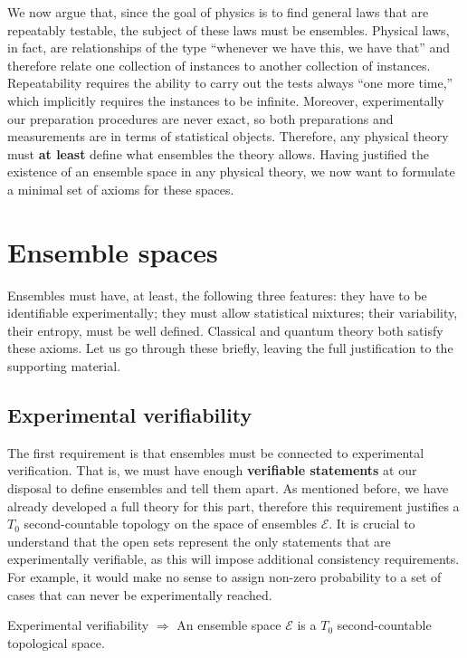 \documentclass[10pt,twocolumn, nofootinbib]{revtex4-2}
\newcommand{\Ens}[1][E] {\mathcal{#1}} %
\begin{document}
We now argue that, since the goal of physics is to find general laws that are repeatably testable, the subject of these laws must be ensembles. Physical laws, in fact, are relationships of the type ``whenever we have this, we have that'' and therefore relate one collection of instances to another collection of instances. Repeatability requires the ability to carry out the tests always ``one more time,'' which implicitly requires the instances to be infinite. Moreover, experimentally our preparation procedures are never exact, so both preparations and measurements are in terms of statistical objects. Therefore, any physical theory must \textbf{at least} define what ensembles the theory allows. Having justified the existence of an ensemble space in any physical theory, we now want to formulate a minimal set of axioms for these spaces.

\section{Ensemble spaces}

Ensembles must have, at least, the following three features: they have to be identifiable experimentally; they must allow statistical mixtures; their variability, their entropy, must be well defined. Classical and quantum theory both satisfy these axioms. Let us go through these briefly, leaving the full justification to the supporting material.

\subsection{Experimental verifiability}
The first requirement is that ensembles must be connected to experimental verification. That is, we must have enough \textbf{verifiable statements} at our disposal to define ensembles and tell them apart. As mentioned before, we have already developed a full theory for this part, therefore this requirement justifies a $T_0$ second-countable topology on the space of ensembles $\Ens$. It is crucial to understand that the open sets represent the only statements that are experimentally verifiable, as this will impose additional consistency requirements. For example, it would make no sense to assign non-zero probability to a set of cases that can never be experimentally reached.

\begin{tcolorbox}[colback=white, colframe=black]
	Experimental verifiability $\Rightarrow$ An ensemble space $\Ens$ is a $T_0$ second-countable topological space.
\end{tcolorbox}
\end{document}
